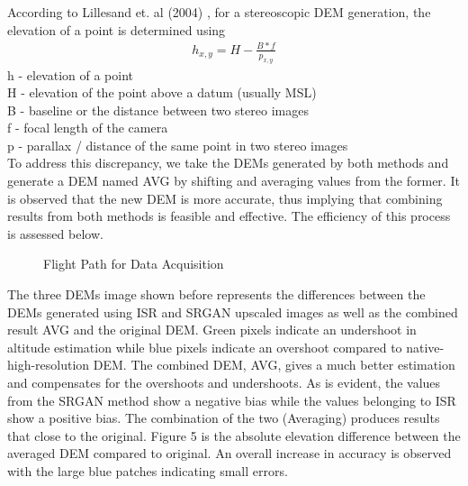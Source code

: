 \documentclass[conference]{IEEEtran}
\begin{document}
According to Lillesand et. al (2004) \cite{lillesand}, for a stereoscopic
DEM generation, the elevation of a point is determined
using \\

\begin{align}
    h_{x,y}= H - \frac{B*f}{p_{x,y}}
\end{align}
h - elevation of a point \\
H - elevation of the point above a datum (usually MSL) \\
B - baseline or the distance between two stereo images \\
f - focal length of the camera \\
p - parallax / distance of the same point in two stereo images \\

To address this discrepancy, we take the DEMs generated
by both methods and generate a DEM named AVG by
shifting and averaging values from the former. It is observed
that the new DEM is more accurate, thus implying that
combining results from both methods is feasible and
effective. The efficiency of this process is assessed below.


\begin{figure}[htbp]
    \caption{Flight Path for Data Acquisition}
    \label{fig4}
\end{figure}

The three DEMs image shown before represents the
differences between the DEMs generated using ISR and
SRGAN upscaled images as well as the combined result
AVG and the original DEM. Green pixels indicate an
undershoot in altitude estimation while blue pixels indicate
an overshoot compared to native-high-resolution DEM. The
combined DEM, AVG, gives a much better estimation and
compensates for the overshoots and undershoots. As is
evident, the values from the SRGAN method show a
negative bias while the values belonging to ISR show a
positive bias. The combination of the two (Averaging)
produces results that close to the original. Figure 5 is the
absolute elevation difference between the averaged DEM
compared to original. An overall increase in accuracy is
observed with the large blue patches indicating small errors.
\end{document}
